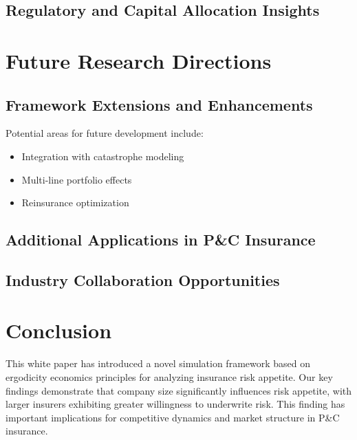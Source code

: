 \documentclass[11pt,letterpaper]{article}
\begin{document}

\subsection{Regulatory and Capital Allocation Insights}


\section{Future Research Directions}

\subsection{Framework Extensions and Enhancements}

Potential areas for future development include:
\begin{itemize}
    \item Integration with catastrophe modeling
    \item Multi-line portfolio effects
    \item Reinsurance optimization
\end{itemize}

\subsection{Additional Applications in P\&C Insurance}


\subsection{Industry Collaboration Opportunities}


\section{Conclusion}

This white paper has introduced a novel simulation framework based on ergodicity economics principles for analyzing insurance risk appetite. Our key findings demonstrate that company size significantly influences risk appetite, with larger insurers exhibiting greater willingness to underwrite risk. This finding has important implications for competitive dynamics and market structure in P\&C insurance.
\end{document}
